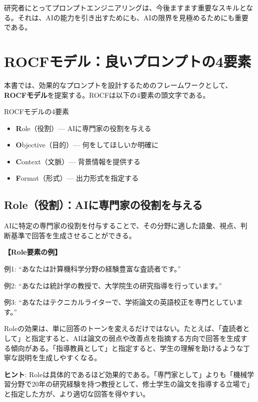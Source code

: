 研究者にとってプロンプトエンジニアリングは、今後ますます重要なスキルとなる。それは、AIの能力を引き出すためにも、AIの限界を見極めるためにも重要である。

\section{ROCFモデル：良いプロンプトの4要素}
\label{sec:2.2}

本書では、効果的なプロンプトを設計するためのフレームワークとして、\textbf{ROCFモデル}を提案する。ROCFは以下の4要素の頭文字である。

\begin{itembox}[l]{ROCFモデルの4要素}
\begin{itemize}
\item \textbf{R}ole（役割）--- AIに専門家の役割を与える
\item \textbf{O}bjective（目的）--- 何をしてほしいか明確に
\item \textbf{C}ontext（文脈）--- 背景情報を提供する
\item \textbf{F}ormat（形式）--- 出力形式を指定する
\end{itemize}
\end{itembox}

\subsection{Role（役割）：AIに専門家の役割を与える}

AIに特定の専門家の役割を付与することで、その分野に適した語彙、視点、判断基準で回答を生成させることができる。

\begin{promptbox}
\textbf{【Role要素の例】}

例1: ``あなたは計算機科学分野の経験豊富な査読者です。''

例2: ``あなたは統計学の教授で、大学院生の研究指導を行っています。''

例3: ``あなたはテクニカルライターで、学術論文の英語校正を専門としています。''
\end{promptbox}

Roleの効果は、単に回答のトーンを変えるだけではない。たとえば、「査読者として」と指定すると、AIは論文の弱点や改善点を指摘する方向で回答を生成する傾向がある。「指導教員として」と指定すると、学生の理解を助けるような丁寧な説明を生成しやすくなる。

\begin{screen}
\textbf{ヒント}: Roleは具体的であるほど効果的である。「専門家として」よりも「機械学習分野で20年の研究経験を持つ教授として、修士学生の論文を指導する立場で」と指定した方が、より適切な回答を得やすい。
\end{screen}

